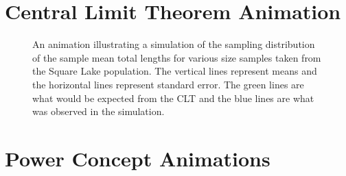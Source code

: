 \documentclass[10pt,openany]{book}\usepackage[]{graphicx}\usepackage[]{color}
\newenvironment{knitrout}{}{} %
\begin{document}
\section{Central Limit Theorem Animation}  \label{app:CLTAnim}
\begin{knitrout}
\color{fgcolor}












































\begin{figure}[hbtp]

{\centering {}

}

\caption[An animation illustrating a simulation of the sampling distribution of the sample mean total lengths for various size samples taken from the Square Lake population]{An animation illustrating a simulation of the sampling distribution of the sample mean total lengths for various size samples taken from the Square Lake population.  The vertical lines represent means and the horizontal lines represent standard error.  The green lines are what would be expected from the CLT and the blue lines are what was observed in the simulation.}\label{fig:CLTanim}
\end{figure}


\end{knitrout}

\newpage
\section{Power Concept Animations}  \label{app:PowerAnim}
\end{document}
